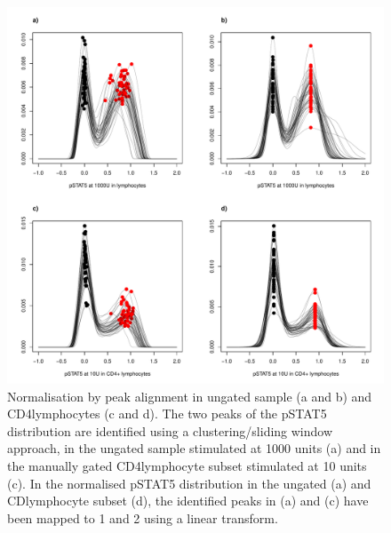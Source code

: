 \begin{figure}[h]
    \centering
    \includegraphics[scale=.5]{IL2/figures/pstat5-peak-normalisation.pdf}
    {Normalisation by peak alignment in ungated sample (a and b) and CD4\positive lymphocytes (c and d).}
    {
      The two peaks of the pSTAT5 distribution are identified using a clustering/sliding window approach,
      in the ungated sample stimulated at 1000 units (a) and in the manually gated CD4\positive lymphocyte subset stimulated at 10 units (c).
      In the normalised pSTAT5 distribution in the ungated (a) and CD\positive lymphocyte subset (d),
      the identified peaks in (a) and (c) have been mapped to 1 and 2 using a linear transform.
    }
\end{figure}





